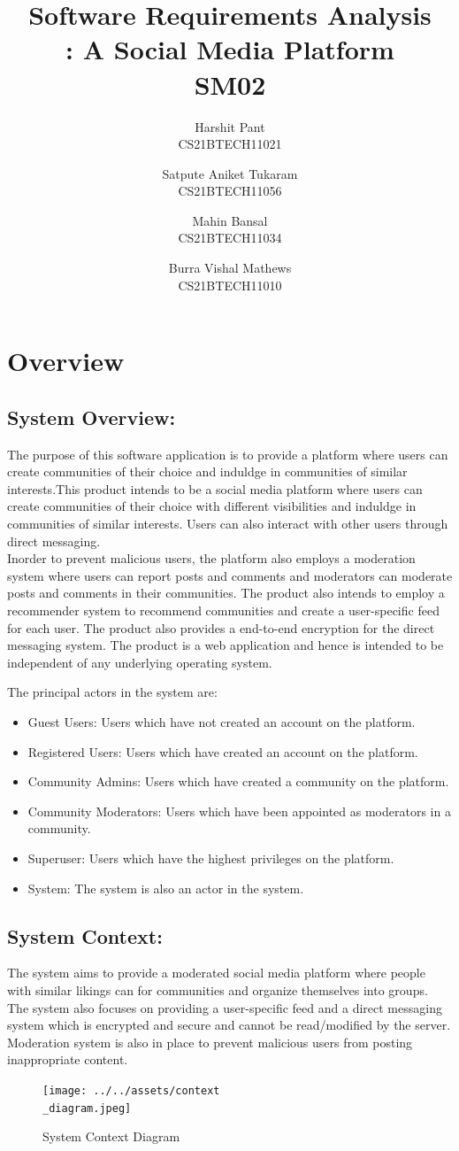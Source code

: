 \documentclass[11pt]{article}
\title{Software Requirements Analysis\\\Name : A Social Media Platform\\ SM02}
\author{Harshit Pant \\ CS21BTECH11021 \and Satpute Aniket Tukaram \\ CS21BTECH11056 \and Mahin Bansal \\ CS21BTECH11034 \and Burra Vishal Mathews \\ CS21BTECH11010}
\date{}
\begin{document}
\maketitle
\section{Overview}
\subsection{System Overview:}
The purpose of this software application is to provide a platform where users can create communities of their choice and induldge in communities of similar interests.This product intends to be a social media platform where users can create communities of their choice with different visibilities and induldge in communities of similar interests. Users can also interact with other users through direct messaging.\\
Inorder to prevent malicious users, the platform also employs a moderation system where users can report posts and comments and moderators can moderate posts and comments in their communities.
The product also intends to employ a recommender system to recommend communities and create a user-specific feed for each user.
The product also provides a end-to-end encryption for the direct messaging system.
The product is a web application and hence is intended to be independent of any underlying operating system.



The principal actors in the system are:
\begin{itemize}
    \item Guest Users: Users which have not created an account on the platform.
    \item Registered Users: Users which have created an account on the platform.
    \item Community Admins: Users which have created a community on the platform.
    \item Community Moderators: Users which have been appointed as moderators in a community.
    \item Superuser: Users which have the highest privileges on the platform.
    \item System: The system is also an actor in the system.
\end{itemize}
\subsection{System Context:}
The system aims to provide a moderated social media platform where people with similar likings can for communities and organize themselves into groups. The system also focuses on providing a user-specific feed and a direct messaging system which is encrypted and secure and cannot be read/modified by the server. Moderation system is also in place to prevent malicious users from posting inappropriate content.
\begin{figure}[H]
    \centering
    \texttt{[image: ../../assets/context\\\_diagram.jpeg]}
    \caption{System Context Diagram}
\end{figure}
\end{document}
